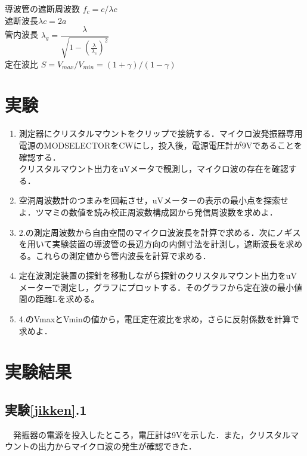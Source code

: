 導波管の遮断周波数 $f_c=c/\lambda c$\\
遮断波長$\lambda c = 2a$\\
管内波長 $\lambda_g = \dfrac{\lambda}{\sqrt{1-(\frac{\lambda}{\lambda_c})^2}}$\\
定在波比 $S=V_{max}/V_{min}=(1+\gamma)/(1-\gamma)$\\

\section{実験\label{jikken}}
\begin{enumerate}
    \item 測定器にクリスタルマウントをクリップで接続する．マイクロ波発振器専用電源のMODSELECTORをCWにし，投入後，電源電圧計が9Vであることを確認する．\\
    クリスタルマウント出力をuVメータで観測し，マイクロ波の存在を確認する．\\

    \item 空洞周波数計のつまみを回転させ，uVメーターの表示の最小点を探索せよ．ツマミの数値を読み校正周波数構成図から発信周波数を求めよ．\\

    \item 2.の測定周波数から自由空間のマイクロ波波長を計算で求める．次にノギスを用いて実験装置の導波管の長辺方向の内側寸法を計測し，遮断波長を求める。これらの測定値から管内波長を計算で求める．\\

    \item 定在波測定装置の探針を移動しながら探針のクリスタルマウント出力をuVメーターで測定し，グラフにプロットする．そのグラフから定在波の最小値間の距離Lを求める。\\

    \item 4.のVmaxとVminの値から，電圧定在波比を求め，さらに反射係数を計算で求めよ．\\
  \end{enumerate}

\newpage
\section{実験結果}
\subsection{実験\ref{jikken}.1}
　発振器の電源を投入したところ，電圧計は9Vを示した．また，クリスタルマウントの出力からマイクロ波の発生が確認できた．

